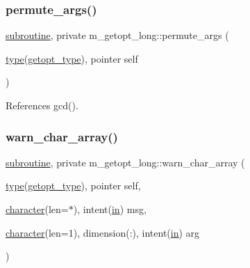 \subsubsection{\texorpdfstring{permute\+\_\+args()}{permute\_args()}}
{\footnotesize\ttfamily \hyperlink{M__stopwatch_83_8txt_acfbcff50169d691ff02d4a123ed70482}{subroutine}, private m\+\_\+getopt\+\_\+long\+::permute\+\_\+args (\begin{DoxyParamCaption}\item[{\hyperlink{stop__watch_83_8txt_a70f0ead91c32e25323c03265aa302c1c}{type}(\hyperlink{structm__getopt__long_1_1getopt__type}{getopt\+\_\+type}), pointer}]{self }\end{DoxyParamCaption})\hspace{0.3cm}{\ttfamily [private]}}



References gcd().

\mbox{\label{namespacem__getopt__long_af1ccef432aa194687e03575a68537553}} 
\subsubsection{\texorpdfstring{warn\+\_\+char\+\_\+array()}{warn\_char\_array()}}
{\footnotesize\ttfamily \hyperlink{M__stopwatch_83_8txt_acfbcff50169d691ff02d4a123ed70482}{subroutine}, private m\+\_\+getopt\+\_\+long\+::warn\+\_\+char\+\_\+array (\begin{DoxyParamCaption}\item[{\hyperlink{stop__watch_83_8txt_a70f0ead91c32e25323c03265aa302c1c}{type}(\hyperlink{structm__getopt__long_1_1getopt__type}{getopt\+\_\+type}), pointer}]{self,  }\item[{\hyperlink{option__stopwatch_83_8txt_abd4b21fbbd175834027b5224bfe97e66}{character}(len=$\ast$), intent(\hyperlink{M__journal_83_8txt_afce72651d1eed785a2132bee863b2f38}{in})}]{msg,  }\item[{\hyperlink{option__stopwatch_83_8txt_abd4b21fbbd175834027b5224bfe97e66}{character}(len=1), dimension(\+:), intent(\hyperlink{M__journal_83_8txt_afce72651d1eed785a2132bee863b2f38}{in})}]{arg }\end{DoxyParamCaption})\hspace{0.3cm}{\ttfamily [private]}}

